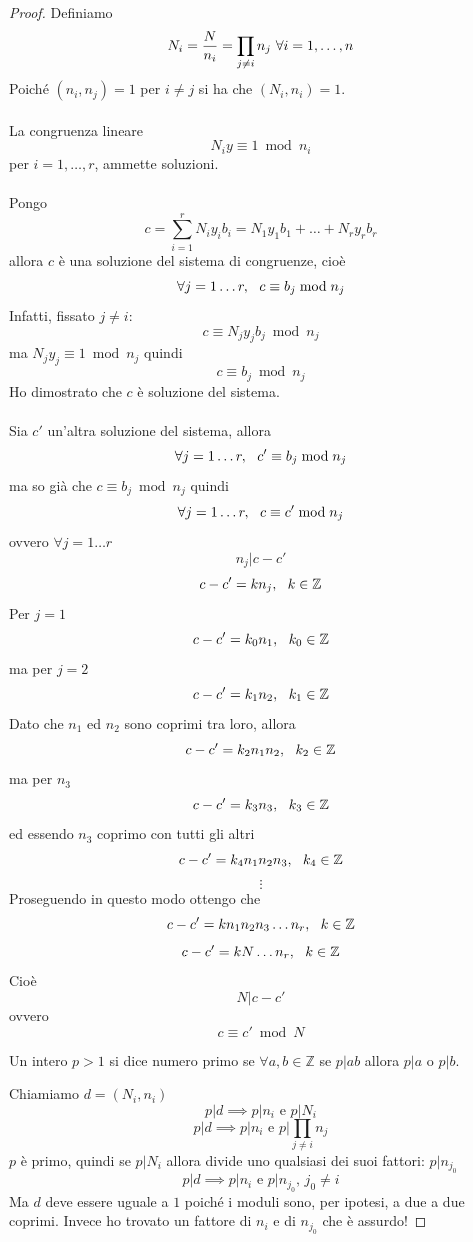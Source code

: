 \documentclass[a4paper,12pt, oneside]{book}
\begin{document}
\begin{teorema}
			\begin{proof}
				Definiamo $$N_i = \frac{N}{n_i} = \prod_{j \not = i} n_j \mbox{\space} \forall i=1,\dots,n$$
				Poiché $(n_i, n_j) = 1$ per $i \not = j$ si ha che $(N_i, n_i) = 1$.\\\\
				La congruenza lineare $$N_i y \equiv 1 \bmod n_i$$ per $i = 1, \dots, r$, ammette soluzioni.\\\\
				Pongo $$c = \sum_{i = 1}^{r} N_iy_ib_i = N_1y_1b_1 + \dots + N_ry_rb_r$$
				allora $c$ è una soluzione del sistema di congruenze, cioè
				$$\forall j = 1 \dots r, \mbox{\space \space} c \equiv b_j \bmod n_j$$
				Infatti, fissato $j \not = i$: $$c \equiv N_jy_jb_j \bmod n_j$$
				ma $N_jy_j \equiv 1 \bmod n_j$ quindi $$c \equiv b_j \bmod n_j$$
				Ho dimostrato che $c$ è soluzione del sistema.\\\\
				Sia $c'$ un'altra soluzione del sistema, allora
				$$\forall j = 1 \dots r, \mbox{\space \space} c' \equiv b_j \bmod n_j$$
				ma so già che $c \equiv b_j \bmod n_j$ quindi
				$$\forall j = 1 \dots r, \mbox{\space \space} c \equiv c' \bmod n_j$$
				ovvero $\forall j = 1 \dots r$
				$$n_j | c-c'$$
				$$c-c' = k n_j, \mbox{\space \space } k \in \mathbb{Z}$$
				Per $j=1$
				$$c-c' = k_0 n_1, \mbox{\space \space } k_0 \in \mathbb{Z}$$
				ma per $j=2$
				$$c-c' = k_1 n_2, \mbox{\space \space } k_1 \in \mathbb{Z}$$
				Dato che $n_1$ ed $n_2$ sono coprimi tra loro, allora
				$$c-c' = k_2 n_1 n_2, \mbox{\space \space } k_2 \in \mathbb{Z}$$
				ma per $n_3$
				$$c-c' = k_3 n_3, \mbox{\space \space } k_3 \in \mathbb{Z}$$
				ed essendo $n_3$ coprimo con tutti gli altri
				$$c-c' = k_4 n_1 n_2 n_3, \mbox{\space \space } k_4 \in \mathbb{Z}$$
				$$\vdots$$
				Proseguendo in questo modo ottengo che
				$$c-c' = k n_1 n_2 n_3 \dots n_r, \mbox{\space \space } k \in \mathbb{Z}$$
				$$c-c' = k N \dots n_r, \mbox{\space \space } k \in \mathbb{Z}$$
				Cioè
				$$N | c - c'$$
				ovvero
				$$c \equiv c' \bmod N$$
				\begin{shaded}
					\begin{definizione}
						Un intero $p > 1$ si dice numero primo se $\forall a,b \in \mathbb{Z}$ se $p|ab$ allora $p|a$ o $p|b$.
					\end{definizione}
				\end{shaded}
				Chiamiamo $d = (N_i, n_i)$
				$$p|d \implies p|n_i \mbox{ e } p|N_i$$
				$$p|d \implies p|n_i \mbox{ e } p|\prod_{j \not = i} n_j$$
				$p$ è primo, quindi se $p|N_i$ allora divide uno qualsiasi dei suoi fattori: $p|n_{j_0}$
				$$p|d \implies p|n_i \mbox{ e } p|n_{j_0} \mbox{, } j_0 \not = i$$
				Ma $d$ deve essere uguale a $1$ poiché i moduli sono, per ipotesi, a due a due coprimi. Invece ho trovato un fattore di $n_i$ e di $n_{j_0}$ che è assurdo!
			\end{proof}
		\end{teorema}
\end{document}
